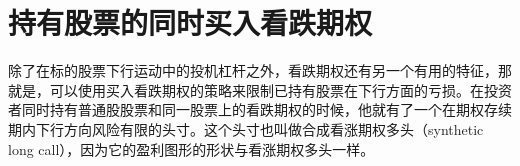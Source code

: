 \chapter{持有股票的同时买入看跌期权}
除了在标的股票下行运动中的投机杠杆之外，看跌期权还有另一个有用的特征，那就是，可以使用买入看跌期权的策略来限制已持有股票在下行方面的亏损。在投资者同时持有普通股股票和同一股票上的看跌期权的时候，他就有了一个在期权存续期内下行方向风险有限的头寸。这个头寸也叫做合成看涨期权多头（synthetic long call），因为它的盈利图形的形状与看涨期权多头一样。